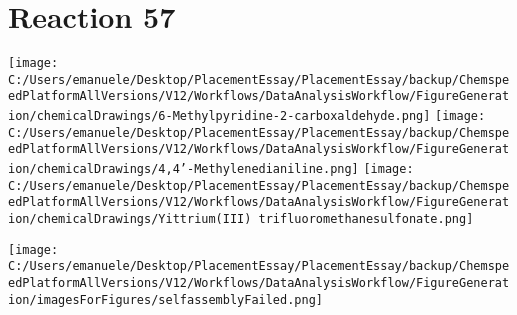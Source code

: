 \documentclass{article}%
\begin{document}
\section*{Reaction 57}%
%
\begin{scheme}[H]%
\begin{minipage}{0.5\textwidth}%
\texttt{[image: C:/Users/emanuele/Desktop/PlacementEssay/PlacementEssay/backup/ChemspeedPlatformAllVersions/V12/Workflows/DataAnalysisWorkflow/FigureGeneration/chemicalDrawings/6-Methylpyridine-2-carboxaldehyde.png]}%
\texttt{[image: C:/Users/emanuele/Desktop/PlacementEssay/PlacementEssay/backup/ChemspeedPlatformAllVersions/V12/Workflows/DataAnalysisWorkflow/FigureGeneration/chemicalDrawings/4,4'-Methylenedianiline.png]}%
\texttt{[image: C:/Users/emanuele/Desktop/PlacementEssay/PlacementEssay/backup/ChemspeedPlatformAllVersions/V12/Workflows/DataAnalysisWorkflow/FigureGeneration/chemicalDrawings/Yittrium(III) trifluoromethanesulfonate.png]}%
\end{minipage}%
\begin{minipage}{0.5\textwidth}%
\begin{center}%
\texttt{[image: C:/Users/emanuele/Desktop/PlacementEssay/PlacementEssay/backup/ChemspeedPlatformAllVersions/V12/Workflows/DataAnalysisWorkflow/FigureGeneration/imagesForFigures/selfassemblyFailed.png]}%
\end{center}%
\end{minipage}%
\caption{Self-assembly of components 8, 17, with Yittrium(III) in a 3.0:1.5:1.0 molar ratio in CH$_3$CN at 60\textdegree C for 40h. These are the reagents (starting materials) for reaction 57.}%
\end{scheme}%
\end{document}
